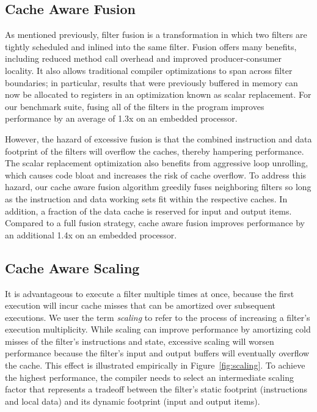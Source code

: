 \subsection*{Cache Aware Fusion}

As mentioned previously, filter fusion is a transformation in which
two filters are tightly scheduled and inlined into the same filter.
Fusion offers many benefits, including reduced method call overhead
and improved producer-consumer locality.  It also allows traditional
compiler optimizations to span across filter boundaries; in
particular, results that were previously buffered in memory can now be
allocated to registers in an optimization known as scalar replacement.
For our benchmark suite, fusing all of the filters in the program
improves performance by an average of 1.3x on an embedded processor.

However, the hazard of excessive fusion is that the combined
instruction and data footprint of the filters will overflow the
caches, thereby hampering performance.  The scalar replacement
optimization also benefits from aggressive loop unrolling, which
causes code bloat and increases the risk of cache overflow.  To
address this hazard, our cache aware fusion algorithm greedily fuses
neighboring filters so long as the instruction and data working sets
fit within the respective caches.  In addition, a fraction of the data
cache is reserved for input and output items.  Compared to a full
fusion strategy, cache aware fusion improves performance by an
additional 1.4x on an embedded processor.

\subsection*{Cache Aware Scaling}

It is advantageous to execute a filter multiple times at once, because
the first execution will incur cache misses that can be amortized over
subsequent executions.  We user the term {\it scaling} to refer to the
process of increasing a filter's execution multiplicity.  While
scaling can improve performance by amortizing cold misses of the
filter's instructions and state, excessive scaling will worsen
performance because the filter's input and output buffers will
eventually overflow the cache.  This effect is illustrated empirically
in Figure~\ref{fig:scaling}.  To achieve the highest performance, the
compiler needs to select an intermediate scaling factor that
represents a tradeoff between the filter's static footprint
(instructions and local data) and its dynamic footprint (input and
output items).

